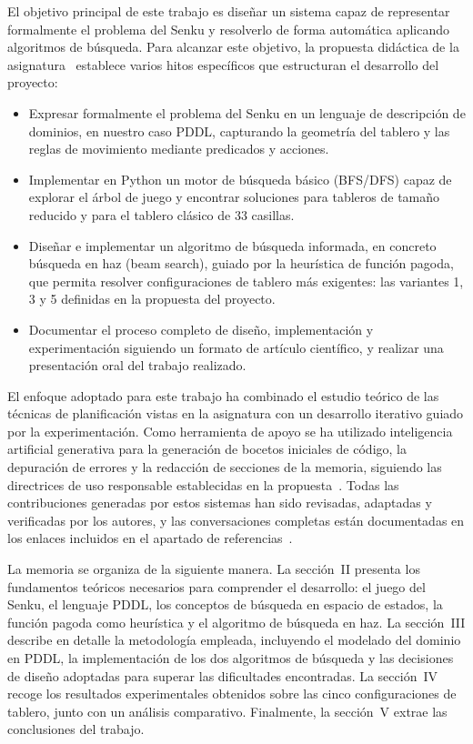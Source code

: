 \documentclass[conference,a4paper]{IEEEtran}
\begin{document}
El objetivo principal de este trabajo es diseñar un sistema capaz de
representar formalmente el problema del Senku y resolverlo de forma automática
aplicando algoritmos de búsqueda. Para alcanzar este objetivo, la propuesta
didáctica de la asignatura~\cite{propuesta-senku} establece varios hitos
específicos que estructuran el desarrollo del proyecto:
\begin{itemize}
  \item Expresar formalmente el problema del Senku en un lenguaje de
    descripción de dominios, en nuestro caso PDDL, capturando la geometría del
    tablero y las reglas de movimiento mediante predicados y acciones.
  \item Implementar en Python un motor de búsqueda básico (BFS/DFS) capaz de
    explorar el árbol de juego y encontrar soluciones para tableros de tamaño
    reducido y para el tablero clásico de 33 casillas.
  \item Diseñar e implementar un algoritmo de búsqueda informada, en concreto
    búsqueda en haz (beam search), guiado por la heurística de función pagoda,
    que permita resolver configuraciones de tablero más exigentes: las
    variantes 1, 3 y 5 definidas en la propuesta del proyecto.
  \item Documentar el proceso completo de diseño, implementación y
    experimentación siguiendo un formato de artículo científico, y realizar una
    presentación oral del trabajo realizado.
\end{itemize}

El enfoque adoptado para este trabajo ha combinado el estudio teórico de las
técnicas de planificación vistas en la asignatura con un desarrollo iterativo
guiado por la experimentación. Como herramienta de apoyo se ha utilizado
inteligencia artificial generativa para la generación de bocetos iniciales de
código, la depuración de errores y la redacción de secciones de la memoria,
siguiendo las directrices de uso responsable establecidas en la
propuesta~\cite{propuesta-senku}. Todas las contribuciones generadas por estos
sistemas han sido revisadas, adaptadas y verificadas por los autores, y las
conversaciones completas están documentadas en los enlaces incluidos en el
apartado de referencias~\cite{ai-plan-tareas,ai-reglas,ai-pddl-dominio,ai-pddl-claude,ai-basic-search,ai-basic-search-opencode,ai-memoria-opencode,ai-chatgpt-latex,ai-chatgpt-pddl}.

La memoria se organiza de la siguiente manera. La sección~II presenta los
fundamentos teóricos necesarios para comprender el desarrollo: el juego del
Senku, el lenguaje PDDL, los conceptos de búsqueda en espacio de estados, la
función pagoda como heurística y el algoritmo de búsqueda en haz. La
sección~III describe en detalle la metodología empleada, incluyendo el
modelado del dominio en PDDL, la implementación de los dos algoritmos de
búsqueda y las decisiones de diseño adoptadas para superar las dificultades
encontradas. La sección~IV recoge los resultados experimentales obtenidos
sobre las cinco configuraciones de tablero, junto con un análisis comparativo.
Finalmente, la sección~V extrae las conclusiones del trabajo.
\end{document}
